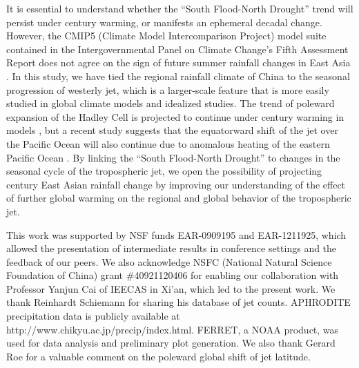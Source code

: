 \documentclass[draft,grl]{AGUTeX}
\begin{document}
\begin{article}
	It is essential to understand whether the ``South Flood-North Drought'' trend will persist under  century warming, or manifests an ephemeral decadal change. However, the CMIP5 (Climate Model Intercomparison Project) model suite contained in the Intergovernmental Panel on Climate Change's Fifth Assessment Report does not agree on the sign of future summer rainfall changes in East Asia \citep{Christensen2011}. In this study, we have tied the regional rainfall climate of China to the seasonal progression of westerly jet, which is a larger-scale feature that is more easily studied in global climate models and idealized studies. The trend of poleward expansion of the Hadley Cell is projected to continue under  century warming in models \citep{Lu2007,Kang2012}, but a recent study suggests that the equatorward shift of the jet over the Pacific Ocean will also continue due to anomalous heating of the eastern Pacific Ocean \citep{Park2014}. By linking the ``South Flood-North Drought'' to changes in the seasonal cycle of the tropospheric jet, we open the possibility of projecting  century East Asian rainfall change by improving our understanding of the effect of further global warming on the regional and global behavior of the tropospheric jet.



\begin{acknowledgments}
This work was supported by NSF funds EAR-0909195 and EAR-1211925, which allowed the presentation of intermediate results in conference settings and the feedback of our peers. We also acknowledge NSFC (National Natural Science Foundation of China) grant \#40921120406 for enabling our collaboration with Professor Yanjun Cai of IEECAS in Xi'an, which led to the present work. We thank Reinhardt Schiemann for sharing his database of jet counts. APHRODITE precipitation data is publicly available at http://www.chikyu.ac.jp/precip/index.html. FERRET, a NOAA product, was used for data analysis and preliminary plot generation. We also thank Gerard Roe for a valuable comment on the poleward global shift of jet latitude.
\end{acknowledgments}




%
%
\end{article}
%
%
%
%
%
\end{document}
